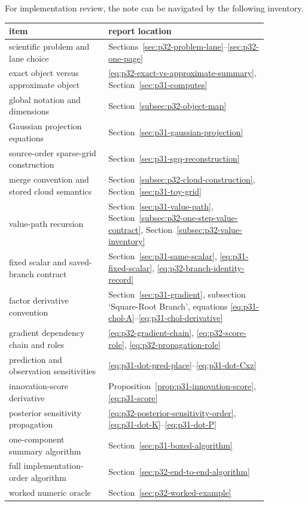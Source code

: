 \documentclass[11pt]{article}
\numberwithin{equation}{section}
\begin{document}
For implementation review, the note can be navigated by the following inventory.
\begin{center}
\small
\begin{tabular}{p{0.33\linewidth}p{0.53\linewidth}}
\toprule
item & report location \\
\midrule
scientific problem and lane choice & Sections~\ref{sec:p32-problem-lane}--\ref{sec:p32-one-page} \\
exact object versus approximate object & \eqref{eq:p32-exact-vs-approximate-summary}, Section~\ref{sec:p31-computes} \\
global notation and dimensions & Section~\ref{subsec:p32-object-map} \\
Gaussian projection equations & Section~\ref{sec:p31-gaussian-projection} \\
source-order sparse-grid construction & Section~\ref{sec:p31-sgq-reconstruction} \\
merge convention and stored cloud semantics & Section~\ref{subsec:p32-cloud-construction}, Section~\ref{sec:p31-toy-grid} \\
value-path recursion & Section~\ref{sec:p31-value-path}, Section~\ref{subsec:p32-one-step-value-contract}, Section~\ref{subsec:p32-value-inventory} \\
fixed scalar and saved-branch contract & Section~\ref{sec:p31-same-scalar}, \eqref{eq:p31-fixed-scalar}, \eqref{eq:p32-branch-identity-record} \\
factor derivative convention & Section~\ref{sec:p31-gradient}, subsection `Square-Root Branch', equations \eqref{eq:p31-chol-A}--\eqref{eq:p31-chol-derivative} \\
gradient dependency chain and roles & \eqref{eq:p32-gradient-chain}, \eqref{eq:p32-score-role}, \eqref{eq:p32-propagation-role} \\
prediction and observation sensitivities & \eqref{eq:p31-dot-pred-place}--\eqref{eq:p31-dot-Cxz} \\
innovation-score derivative & Proposition~\ref{prop:p31-innovation-score}, \eqref{eq:p31-score} \\
posterior sensitivity propagation & \eqref{eq:p32-posterior-sensitivity-order}, \eqref{eq:p31-dot-K}--\eqref{eq:p31-dot-P} \\
one-component summary algorithm & Section~\ref{sec:p31-boxed-algorithm} \\
full implementation-order algorithm & Section~\ref{sec:p32-end-to-end-algorithm} \\
worked numeric oracle & Section~\ref{sec:p32-worked-example} \\

\end{tabular}
\end{center}
\end{document}
